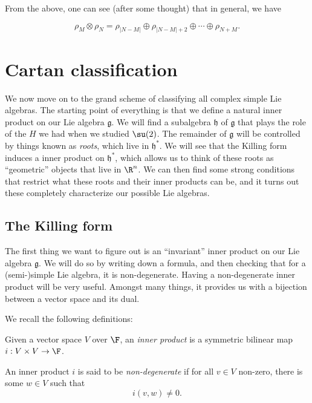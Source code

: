 \documentclass[a4paper]{article}
\begin{document}
From the above, one can see (after some thought) that in general, we have
\begin{prop}
  \[
    \rho_M \otimes \rho_N = \rho_{|N - M|} \oplus \rho_{|N - M| + 2} \oplus \cdots \oplus \rho_{N + M}.
  \]
\end{prop}

\section{Cartan classification}
We now move on to the grand scheme of classifying all complex simple Lie algebras. The starting point of everything is that we define a natural inner product on our Lie algebra $\mathfrak{g}$. We will find a subalgebra $\mathfrak{h}$ of $\mathfrak{g}$ that plays the role of the $H$ we had when we studied $\su(2)$. The remainder of $\mathfrak{g}$ will be controlled by things known as \emph{roots}, which live in $\mathfrak{h}^*$. We will see that the Killing form induces a inner product on $\mathfrak{h}^*$, which allows us to think of these roots as ``geometric'' objects that live in $\R^n$. We can then find some strong conditions that restrict what these roots and their inner products can be, and it turns out these completely characterize our possible Lie algebras.

\subsection{The Killing form}
The first thing we want to figure out is an ``invariant'' inner product on our Lie algebra $\mathfrak{g}$. We will do so by writing down a formula, and then checking that for a (semi-)simple Lie algebra, it is non-degenerate. Having a non-degenerate inner product will be very useful. Amongst many things, it provides us with a bijection between a vector space and its dual.

We recall the following definitions:
\begin{defi}
  Given a vector space $V$ over $\F$, an \emph{inner product} is a symmetric bilinear map $i: V \times V \to \F$.
\end{defi}

\begin{defi}
  An inner product $i$ is said to be \emph{non-degenerate} if for all $v \in V$ non-zero, there is some $w \in V$ such that
  \[
    i(v, w) \not= 0.
  \]
\end{defi}
\end{document}
